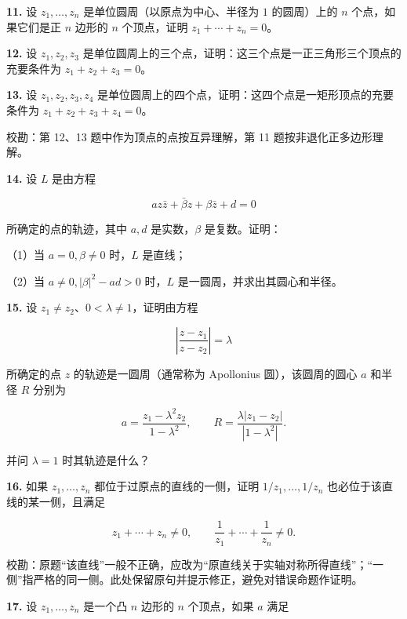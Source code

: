 \documentclass[11pt,a4paper]{article}
\begin{document}
\par{}
\noindent\textbf{11.} 设 \(z_1,\ldots,z_n\) 是单位圆周（以原点为中心、半径为
\(1\) 的圆周）上的 \(n\) 个点，如果它们是正 \(n\) 边形的 \(n\)
个顶点，证明 \(z_1+\cdots+z_n=0\)。

\par{}
\noindent\textbf{12.} 设 \(z_1,z_2,z_3\)
是单位圆周上的三个点，证明：这三个点是一正三角形三个顶点的充要条件为
\(z_1+z_2+z_3=0\)。

\par{}
\noindent\textbf{13.} 设 \(z_1,z_2,z_3,z_4\)
是单位圆周上的四个点，证明：这四个点是一矩形顶点的充要条件为
\(z_1+z_2+z_3+z_4=0\)。

校勘：第 12、13 题中作为顶点的点按互异理解，第 11
题按非退化正多边形理解。

\par{}
\noindent\textbf{14.} 设 \(L\) 是由方程

\[
az\bar z+\bar\beta z+\beta\bar z+d=0
\]

所确定的点的轨迹，其中 \(a,d\) 是实数，\(\beta\) 是复数。证明：

（1）当 \(a=0,\beta\ne0\) 时，\(L\) 是直线；

（2）当 \(a\ne0,|\beta|^2-ad>0\) 时，\(L\)
是一圆周，并求出其圆心和半径。

\par{}
\noindent\textbf{15.} 设 \(z_1\ne z_2\)、\(0<\lambda\ne1\)，证明由方程

\[
\left|\frac{z-z_1}{z-z_2}\right|=\lambda
\]

所确定的点 \(z\) 的轨迹是一圆周（通常称为 Apollonius 圆），该圆周的圆心
\(a\) 和半径 \(R\) 分别为

\[
a=\frac{z_1-\lambda^2z_2}{1-\lambda^2},\qquad
R=\frac{\lambda|z_1-z_2|}{|1-\lambda^2|}.
\]

并问 \(\lambda=1\) 时其轨迹是什么？

\par{}
\noindent\textbf{16.} 如果 \(z_1,\ldots,z_n\) 都位于过原点的直线的一侧，证明
\(1/z_1,\ldots,1/z_n\) 也必位于该直线的某一侧，且满足

\[
z_1+\cdots+z_n\ne0,\qquad
\frac1{z_1}+\cdots+\frac1{z_n}\ne0.
\]

校勘：原题``该直线''一般不正确，应改为``原直线关于实轴对称所得直线''；``一侧''指严格的同一侧。此处保留原句并提示修正，避免对错误命题作证明。

\par{}
\noindent\textbf{17.} 设 \(z_1,\ldots,z_n\) 是一个凸 \(n\) 边形的 \(n\)
个顶点，如果 \(a\) 满足
\end{document}
